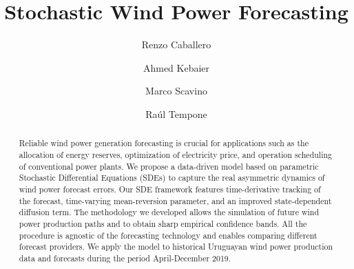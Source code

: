 \documentclass[11pt]{article}
\theoremstyle{definition}
\begin{document}
\title{ Stochastic Wind Power Forecasting }  %

\author[1]{Renzo Caballero}
\author[2]{Ahmed Kebaier}
\author[3]{Marco Scavino}
\author[4]{ Ra\'ul  Tempone}


\maketitle


\begin{abstract}

Reliable wind power generation forecasting is crucial for applications such as the allocation of energy reserves, optimization of electricity price, and operation scheduling of conventional power plants. We propose a data-driven model based on parametric Stochastic Differential Equations (SDEs) to capture the real asymmetric dynamics of wind power forecast errors. Our SDE framework features time-derivative tracking of the forecast, time-varying mean-reversion parameter, and an improved state-dependent diffusion term. The methodology we developed allows the simulation of future wind power production paths and to obtain sharp empirical confidence bands. All the procedure is agnostic of the forecasting technology and enables comparing different forecast providers. We apply the model to historical Uruguayan wind power production data and forecasts during the period April-December 2019.

\end{abstract}
\end{document}
